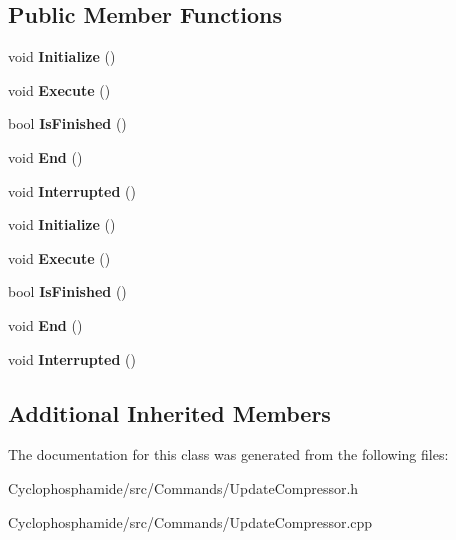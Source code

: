 \subsection*{Public Member Functions}
\begin{DoxyCompactItemize}
\item 
\hypertarget{class_update_compressor_aa9b278faa22a0b30d74ba0bf5c283621}{}void {\bfseries Initialize} ()\label{class_update_compressor_aa9b278faa22a0b30d74ba0bf5c283621}

\item 
\hypertarget{class_update_compressor_a1dae416361c23fb33ba08255cf6c5df2}{}void {\bfseries Execute} ()\label{class_update_compressor_a1dae416361c23fb33ba08255cf6c5df2}

\item 
\hypertarget{class_update_compressor_a2a1604f7fff8e360a33f371cd2b9ebb1}{}bool {\bfseries Is\+Finished} ()\label{class_update_compressor_a2a1604f7fff8e360a33f371cd2b9ebb1}

\item 
\hypertarget{class_update_compressor_ac6f4086fde7c7eac4a79cf9b65a58ee5}{}void {\bfseries End} ()\label{class_update_compressor_ac6f4086fde7c7eac4a79cf9b65a58ee5}

\item 
\hypertarget{class_update_compressor_a4fc03700e69bcd8ab2b510e754e9a15d}{}void {\bfseries Interrupted} ()\label{class_update_compressor_a4fc03700e69bcd8ab2b510e754e9a15d}

\item 
\hypertarget{class_update_compressor_aa9b278faa22a0b30d74ba0bf5c283621}{}void {\bfseries Initialize} ()\label{class_update_compressor_aa9b278faa22a0b30d74ba0bf5c283621}

\item 
\hypertarget{class_update_compressor_a1dae416361c23fb33ba08255cf6c5df2}{}void {\bfseries Execute} ()\label{class_update_compressor_a1dae416361c23fb33ba08255cf6c5df2}

\item 
\hypertarget{class_update_compressor_a2a1604f7fff8e360a33f371cd2b9ebb1}{}bool {\bfseries Is\+Finished} ()\label{class_update_compressor_a2a1604f7fff8e360a33f371cd2b9ebb1}

\item 
\hypertarget{class_update_compressor_ac6f4086fde7c7eac4a79cf9b65a58ee5}{}void {\bfseries End} ()\label{class_update_compressor_ac6f4086fde7c7eac4a79cf9b65a58ee5}

\item 
\hypertarget{class_update_compressor_a4fc03700e69bcd8ab2b510e754e9a15d}{}void {\bfseries Interrupted} ()\label{class_update_compressor_a4fc03700e69bcd8ab2b510e754e9a15d}

\end{DoxyCompactItemize}
\subsection*{Additional Inherited Members}


The documentation for this class was generated from the following files\+:\begin{DoxyCompactItemize}
\item 
Cyclophosphamide/src/\+Commands/Update\+Compressor.\+h\item 
Cyclophosphamide/src/\+Commands/Update\+Compressor.\+cpp\end{DoxyCompactItemize}
